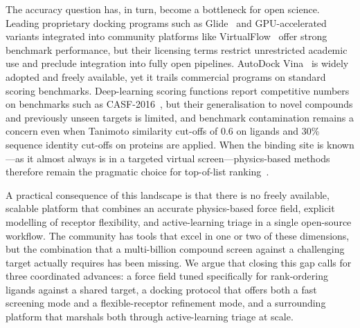 \documentclass[11pt]{article}
\begin{document}
The accuracy question has, in turn, become a bottleneck for open science.
Leading proprietary docking programs such as Glide~\citep{friesner2004glide}
and GPU-accelerated variants integrated into community platforms like
VirtualFlow~\citep{gorgulla2020virtualflowgwo} offer strong benchmark
performance, but their licensing terms restrict unrestricted academic use
and preclude integration into fully open pipelines. AutoDock
Vina~\citep{trott2010vina} is widely adopted and freely available, yet it
trails commercial programs on standard scoring benchmarks. Deep-learning
scoring functions report competitive numbers on benchmarks such as
CASF-2016~\citep{su2019casf2016,liu2017pdbbind,scantlebury2023pointvs},
but their generalisation to novel compounds and previously unseen targets
is limited, and benchmark contamination remains a concern even when
Tanimoto similarity cut-offs of 0.6 on ligands and 30\% sequence identity
cut-offs on proteins are applied. When the binding site is known---as it
almost always is in a targeted virtual screen---physics-based methods
therefore remain the pragmatic choice for top-of-list
ranking~\citep{chaput2017usc,ebejer2019ligity,li2024cache}.

A practical consequence of this landscape is that there is no freely
available, scalable platform that combines an accurate physics-based force
field, explicit modelling of receptor flexibility, and active-learning
triage in a single open-source workflow. The community has tools that
excel in one or two of these dimensions, but the combination that a
multi-billion compound screen against a challenging target actually
requires has been missing. We argue that closing this gap calls for three
coordinated advances: a force field tuned specifically for
rank-ordering ligands against a shared target, a docking protocol that
offers both a fast screening mode and a flexible-receptor refinement
mode, and a surrounding platform that marshals both through active-learning
triage at scale.
\end{document}
